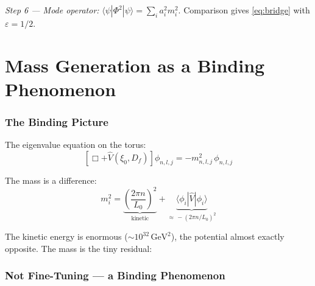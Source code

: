 \textit{Step 6 — Mode operator:}
$\langle\psi|\Phi^2|\psi\rangle = \sum_i a_i^2 m_i^2$.
Comparison gives \eqref{eq:bridge} with $\varepsilon = 1/2$.

\part{Mass Generation as a Binding Phenomenon}

\section{The Binding Picture}

The eigenvalue equation on the torus:
\begin{equation}
  \left[\Box + \hat{V}(\xi_0, D_f)\right]\phi_{n,l,j} = -m_{n,l,j}^2\,\phi_{n,l,j}
\end{equation}

The mass is a difference:
\begin{equation}
  m_i^2
  = \underbrace{\left(\frac{2\pi n}{L_0}\right)^2}_{\text{kinetic}}
  + \underbrace{\langle\phi_i|\hat{V}|\phi_i\rangle}_{\approx\,-(2\pi n/L_0)^2}
\end{equation}

The kinetic energy is enormous ($\sim 10^{32}\,\text{GeV}^2$), the potential
almost exactly opposite. The mass is the tiny residual:

\begin{center}
{\footnotesize
{}
}
\end{center}

\section{Not Fine-Tuning --- a Binding Phenomenon}

